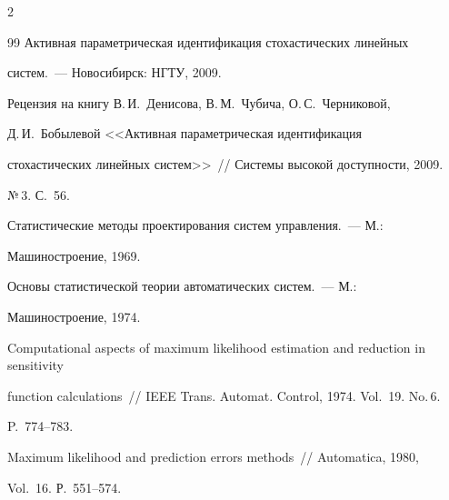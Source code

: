 \begin{multicols}{2}
{{\begin{thebibliography}{99}
Активная параметрическая идентификация стохастических линейных


сис\-тем.~--- Новосибирск: НГТУ, 2009.









Рецензия на книгу В.\,И.~Денисова, В.\,М.~Чубича, О.\,С.~Черниковой,


Д.\,И.~Бобылевой <<Активная параметрическая идентификация


стохастических линейных систем>>~// Системы высокой доступности, 2009.


№\,3. С.~56.









Статистические методы проектирования систем управления.~--- М.:


Машиностроение, 1969.









Основы статистической теории автоматических систем.~--- М.:


Машиностроение, 1974.









Computational aspects of maximum likelihood estimation and reduction in sensitivity


function calculations~// IEEE Trans. Automat. Control, 1974. Vol.~19. No.\,6.


P.~774--783.









Maximum likelihood and prediction errors methods~// Automatica, 1980,


Vol.~16. Р.~551--574.








\end{thebibliography}}}
\end{multicols}
